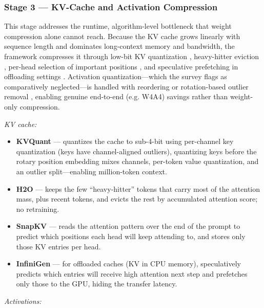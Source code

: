 \documentclass[
11pt, %
english, %
singlespacing, %
headsepline, %
]{MastersDoctoralThesis} %
\begin{document}
\subsubsection{Stage 3 --- KV-Cache and Activation Compression}

This stage addresses the runtime, algorithm-level bottleneck that weight compression alone cannot reach. Because the KV cache grows linearly with sequence length and dominates long-context memory and bandwidth, the framework compresses it through low-bit KV quantization \cite{hooper2024kvquant}, heavy-hitter eviction \cite{zhang2023h2o}, per-head selection of important positions \cite{li2024snapkv}, and speculative prefetching in offloading settings \cite{lee2024infinigen}. Activation quantization---which the survey flags as comparatively neglected---is handled with reordering \cite{yuan2023rptq} or rotation-based outlier removal \cite{ashkboos2024quarot}, enabling genuine end-to-end (e.g. W4A4) savings rather than weight-only compression.

\emph{KV cache:}

\begin{itemize}

  \item \textbf{KVQuant} \cite{hooper2024kvquant} --- quantizes the cache to sub-4-bit using per-channel key quantization (keys have channel-aligned outliers), quantizing keys before the rotary position embedding mixes channels, per-token value quantization, and an outlier split---enabling million-token context.

  \item \textbf{H2O} \cite{zhang2023h2o} --- keeps the few ``heavy-hitter'' tokens that carry most of the attention mass, plus recent tokens, and evicts the rest by accumulated attention score; no retraining.

  \item \textbf{SnapKV} \cite{li2024snapkv} --- reads the attention pattern over the end of the prompt to predict which positions each head will keep attending to, and stores only those KV entries per head.

  \item \textbf{InfiniGen} \cite{lee2024infinigen} --- for offloaded caches (KV in CPU memory), speculatively predicts which entries will receive high attention next step and prefetches only those to the GPU, hiding the transfer latency.

\end{itemize}

\emph{Activations:}
\end{document}

